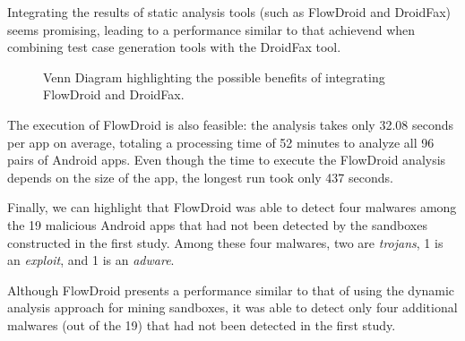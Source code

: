 \begin{finding}
  Integrating the results of static analysis tools
  (such as FlowDroid and DroidFax) seems promising,
  leading to a performance similar to that achievend
  when combining test case generation tools with the
  DroidFax tool. 
\end{finding}

\begin{figure}
  \caption{Venn Diagram highlighting the possible benefits of
    integrating FlowDroid and DroidFax.}
  \label{fig:venn-plot2}

\end{figure}

The execution of FlowDroid is also feasible: the analysis takes only
32.08 seconds per app on average, totaling a processing time of 52
minutes to analyze all 96 pairs of Android apps.
Even though the time to execute the FlowDroid analysis depends on the size
of the app, the longest run took only 437 seconds. 

Finally, we can highlight that FlowDroid was able to detect four malwares among the 19 malicious Android apps that had not
been detected by the sandboxes constructed in the first study. Among these
four malwares, two are \emph{trojans}, 1 is an \emph{exploit}, and 1
is an \emph{adware}.

\begin{finding}
  Although FlowDroid presents a performance similar
  to that of using the dynamic analysis approach for mining sandboxes,
  it was able to detect only four additional malwares (out of the
  19) that had not been detected in the first study. 
\end{finding}

